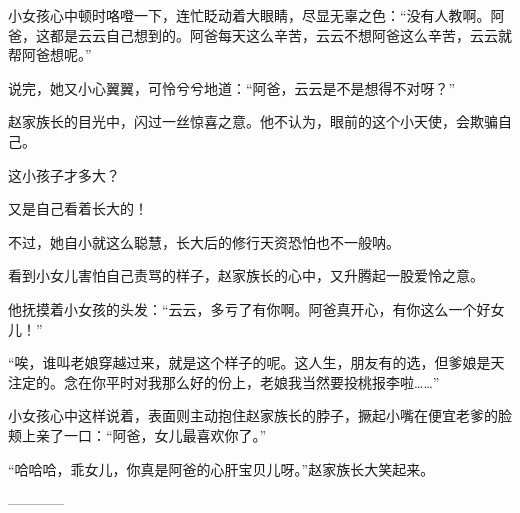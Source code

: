 \begin{this_body}
小女孩心中顿时咯噔一下，连忙眨动着大眼睛，尽显无辜之色：“没有人教啊。阿爸，这都是云云自己想到的。阿爸每天这么辛苦，云云不想阿爸这么辛苦，云云就帮阿爸想呢。”

说完，她又小心翼翼，可怜兮兮地道：“阿爸，云云是不是想得不对呀？”

赵家族长的目光中，闪过一丝惊喜之意。他不认为，眼前的这个小天使，会欺骗自己。

这小孩子才多大？

又是自己看着长大的！

不过，她自小就这么聪慧，长大后的修行天资恐怕也不一般呐。

看到小女儿害怕自己责骂的样子，赵家族长的心中，又升腾起一股爱怜之意。

他抚摸着小女孩的头发：“云云，多亏了有你啊。阿爸真开心，有你这么一个好女儿！”

“唉，谁叫老娘穿越过来，就是这个样子的呢。这人生，朋友有的选，但爹娘是天注定的。念在你平时对我那么好的份上，老娘我当然要投桃报李啦……”

小女孩心中这样说着，表面则主动抱住赵家族长的脖子，撅起小嘴在便宜老爹的脸颊上亲了一口：“阿爸，女儿最喜欢你了。”

“哈哈哈，乖女儿，你真是阿爸的心肝宝贝儿呀。”赵家族长大笑起来。

------------

\end{this_body}

